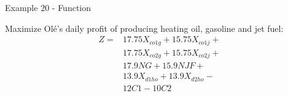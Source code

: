 \begin{frame}{Example 20 - Function}

Maximize Olé's daily profit of producing heating oil, gasoline and jet fuel:
\begin{align*}
    Z =& 17.75X_{co1g} + 15.75X_{co1j} + \\
       & 17.75X_{co2g} + 15.75X_{co2j} + \\
       & 17.9NG + 15.9NJF + \\
       & 13.9X_{d1ho} + 13.9X_{d2ho} - \\
       & 12C1 - 10C2
\end{align*}

\end{frame}
